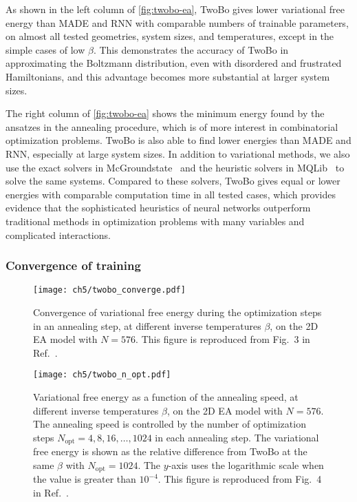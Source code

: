 As shown in the left column of \cref{fig:twobo-ea}, TwoBo gives lower variational free energy than MADE and RNN with comparable numbers of trainable parameters, on almost all tested geometries, system sizes, and temperatures, except in the simple cases of low $\beta$. This demonstrates the accuracy of TwoBo in approximating the Boltzmann distribution, even with disordered and frustrated Hamiltonians, and this advantage becomes more substantial at larger system sizes.

The right column of \cref{fig:twobo-ea} shows the minimum energy found by the ansatzes in the annealing procedure, which is of more interest in combinatorial optimization problems. TwoBo is also able to find lower energies than MADE and RNN, especially at large system sizes. In addition to variational methods, we also use the exact solvers in McGroundstate~\cite{charfreitag2022mcsparse} and the heuristic solvers in MQLib~\cite{dunning2018what} to solve the same systems. Compared to these solvers, TwoBo gives equal or lower energies with comparable computation time in all tested cases, which provides evidence that the sophisticated heuristics of neural networks outperform traditional methods in optimization problems with many variables and complicated interactions.

\subsubsection{Convergence of training}

\begin{figure}[htb]
\centering
\texttt{[image: ch5/twobo\_converge.pdf]}
\caption[Convergence of TwoBo variational free energy in training]{
Convergence of variational free energy during the optimization steps in an annealing step, at different inverse temperatures $\beta$, on the 2D EA model with $N = 576$.
This figure is reproduced from Fig.~3 in Ref.~\cite{biazzo2024sparse}.
}
\label{fig:twobo-converge}
\end{figure}

\begin{figure}[htb]
\centering
\texttt{[image: ch5/twobo\_n\_opt.pdf]}
\caption[TwoBo variational free energy vs.\ annealing speed]{
Variational free energy as a function of the annealing speed, at different inverse temperatures $\beta$, on the 2D EA model with $N = 576$.
The annealing speed is controlled by the number of optimization steps $N_\text{opt} = 4, 8, 16, \ldots, 1024$ in each annealing step.
The variational free energy is shown as the relative difference from TwoBo at the same $\beta$ with $N_\text{opt} = 1024$.
The $y$-axis uses the logarithmic scale when the value is greater than $10^{-4}$.
This figure is reproduced from Fig.~4 in Ref.~\cite{biazzo2024sparse}.
}
\label{fig:twobo-n-opt}
\end{figure}

